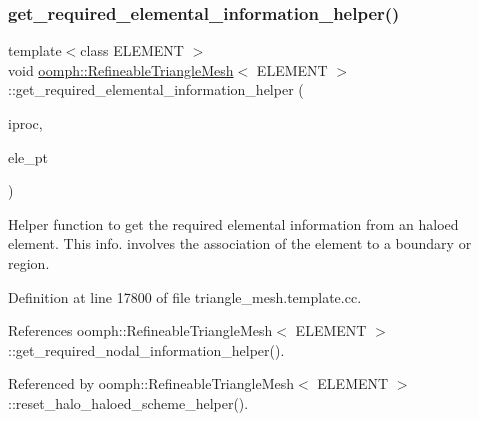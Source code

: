 \subsubsection{\texorpdfstring{get\+\_\+required\+\_\+elemental\+\_\+information\+\_\+helper()}{get\_required\_elemental\_information\_helper()}}
{\footnotesize\ttfamily template$<$class E\+L\+E\+M\+E\+NT $>$ \\
void \hyperlink{classoomph_1_1RefineableTriangleMesh}{oomph\+::\+Refineable\+Triangle\+Mesh}$<$ E\+L\+E\+M\+E\+NT $>$\+::get\+\_\+required\+\_\+elemental\+\_\+information\+\_\+helper (\begin{DoxyParamCaption}\item[{unsigned \&}]{iproc,  }\item[{Finite\+Element $\ast$}]{ele\+\_\+pt }\end{DoxyParamCaption})\hspace{0.3cm}{\ttfamily [protected]}}



Helper function to get the required elemental information from an haloed element. This info. involves the association of the element to a boundary or region. 



Definition at line 17800 of file triangle\+\_\+mesh.\+template.\+cc.



References oomph\+::\+Refineable\+Triangle\+Mesh$<$ E\+L\+E\+M\+E\+N\+T $>$\+::get\+\_\+required\+\_\+nodal\+\_\+information\+\_\+helper().



Referenced by oomph\+::\+Refineable\+Triangle\+Mesh$<$ E\+L\+E\+M\+E\+N\+T $>$\+::reset\+\_\+halo\+\_\+haloed\+\_\+scheme\+\_\+helper().

\mbox{\label{classoomph_1_1RefineableTriangleMesh_a83ad5e6390903ae481046c480e02ff65}} 
